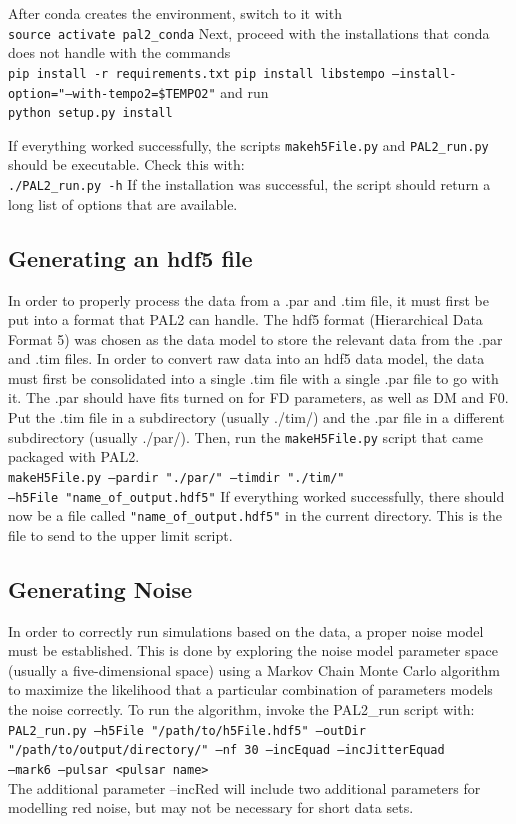 \documentclass[12pt]{article}
\newcommand{\code}[1]{\colorbox{light-gray}{\texttt{#1}}}
\begin{document}
After conda creates the environment, switch to it with 
\\
\code{source activate pal2\_conda}
Next, proceed with the installations that conda does not handle with the
commands
\\
\code{pip install -r requirements.txt}
\code{pip install libstempo --install-option="--with-tempo2=\$TEMPO2"}
and run
\\
\code{python setup.py install}

If everything worked successfully, the scripts \texttt{makeh5File.py} and
\texttt{PAL2\_run.py} should
be executable. Check this with:
\\
\code{./PAL2\_run.py -h}
If the installation was successful, the script should return a long list of
options that are available.


\subsection{Generating an hdf5 file}

In order to properly process the data from a .par and .tim file, it must first 
be put into a format that PAL2 can handle. The hdf5 format (Hierarchical Data
Format 5) was chosen as the data model to store the relevant data from the .par
and .tim files. 
In order to convert raw data into an hdf5 data model, the data must first be
consolidated into a single .tim file with a single .par file to go with it. The
.par should have fits turned on for FD parameters, as well as DM and F0.
Put the .tim file in a subdirectory (usually ./tim/) and the .par file in a
different subdirectory (usually ./par/). Then, run the \texttt{makeH5File.py} script that
came packaged with PAL2.
\\
\code{makeH5File.py --pardir "./par/" --timdir "./tim/"}\\
\code{--h5File "name\_of\_output.hdf5"}
If everything worked successfully, there should now be a file called
\texttt{"name\_of\_output.hdf5"} in the current directory. This is the file to send to the
upper limit script.

\subsection{Generating Noise}

In order to correctly run simulations based on the data, a proper noise model
must be established. This is done by exploring the noise model parameter space
(usually a five-dimensional space) using a Markov Chain Monte Carlo algorithm to
maximize the likelihood that a particular combination of parameters models the
noise correctly. To run the algorithm, invoke the PAL2\_run script with:
\\
\code{PAL2\_run.py --h5File "/path/to/h5File.hdf5" --outDir}\\
\code{"/path/to/output/directory/" --nf 30 --incEquad --incJitterEquad}\\
\code{--mark6 --pulsar <pulsar name>}\\
The additional parameter --incRed will include two additional parameters for
modelling red noise, but may not be necessary for short data sets.
\end{document}
